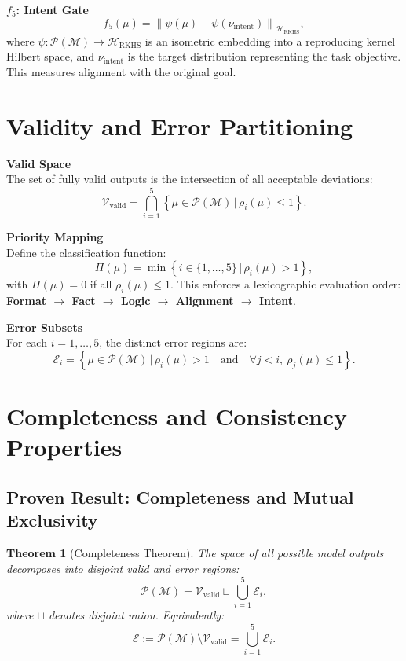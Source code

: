 \documentclass[11pt,a4paper]{article}
\theoremstyle{plain}
\newtheorem{theorem}{Theorem}[section]
\begin{document}
	\vspace{0.5em}
	\noindent\textbf{$f_5$: Intent Gate}
	\[
	f_5(\mu) = \left\| \psi(\mu) - \psi(\nu_{\text{intent}}) \right\|_{\mathcal{H}_{\text{RKHS}}},
	\]
	where $\psi: \mathcal{P}(\mathcal{M}) \to \mathcal{H}_{\text{RKHS}}$ is an isometric embedding into a reproducing kernel Hilbert space, and $\nu_{\text{intent}}$ is the target distribution representing the task objective. This measures alignment with the original goal.
	
	\section{Validity and Error Partitioning}
	
	\noindent\textbf{Valid Space}\\
	The set of fully valid outputs is the intersection of all acceptable deviations:
	\[
	\mathcal{V}_{\text{valid}} = \bigcap_{i=1}^5 \left\{ \mu \in \mathcal{P}(\mathcal{M}) \,\bigg|\, \rho_i(\mu) \le 1 \right\}.
	\]
	
	\vspace{0.5em}
	\noindent\textbf{Priority Mapping}\\
	Define the classification function:
	\[
	\Pi(\mu) = \min\left\{ i \in \{1,\dots,5\} \,\bigg|\, \rho_i(\mu) > 1 \right\},
	\]
	with $\Pi(\mu) = 0$ if all $\rho_i(\mu) \le 1$. This enforces a lexicographic evaluation order: \textbf{Format $\to$ Fact $\to$ Logic $\to$ Alignment $\to$ Intent}.
	
	\vspace{0.5em}
	\noindent\textbf{Error Subsets}\\
	For each $i = 1, \dots, 5$, the distinct error regions are:
	\[
	\mathcal{E}_i = \left\{ \mu \in \mathcal{P}(\mathcal{M}) \,\bigg|\, \rho_i(\mu) > 1 \quad \text{and} \quad \forall j < i,\ \rho_j(\mu) \le 1 \right\}.
	\]
	
	\section{Completeness and Consistency Properties}
	
	\subsection{Proven Result: Completeness and Mutual Exclusivity}
	
	\begin{theorem}[Completeness Theorem]
		The space of all possible model outputs decomposes into disjoint valid and error regions:
		\[
		\mathcal{P}(\mathcal{M}) = \mathcal{V}_{\text{valid}} \sqcup \bigcup_{i=1}^5 \mathcal{E}_i,
		\]
		where $\sqcup$ denotes disjoint union. Equivalently:
		\[
		\mathcal{E} := \mathcal{P}(\mathcal{M}) \setminus \mathcal{V}_{\text{valid}} = \bigcup_{i=1}^5 \mathcal{E}_i.
		\]
	\end{theorem}
	
\end{document}
